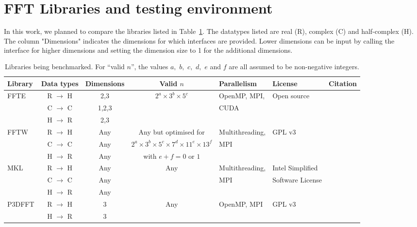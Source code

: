 \documentclass[a4]{article}
\begin{document}
\section{FFT Libraries and testing environment}\label{Sec:libs}

In this work, we planned to compare the libraries listed in Table~\ref{Tbl:libs}. 
The datatypes listed are real (R), complex (C) and half-complex (H). The column 
"Dimensions" indicates the dimensions for which interfaces are provided. Lower 
dimensions can be input by calling the interface for higher dimensions and 
setting the dimension size to 1 for the additional dimensions.

\begin{table}[h]
\begin{center}
\begin{small}
\begin{tabular}{|l|c|c|c|l|l|c|}
\hline
\textbf{Library} & \textbf{Data types} & \textbf{Dimensions} & \textbf{Valid $n$} & \textbf{Parallelism} & \textbf{License} & \textbf{Citation} \\ \hline
FFTE & R $\rightarrow$ H & 2,3   & $2^a\times 3^b \times 5^c$ & OpenMP, MPI,  & Open source & \cite{FFTE} \\
     & C $\rightarrow$ C & 1,2,3 & & CUDA & & \\
     & H $\rightarrow$ R & 2,3   & & & & \\ \hline
FFTW & R $\rightarrow$ H & Any   & Any but optimised for  & Multithreading, & GPL v3 & \cite{FFTW} \\
     & C $\rightarrow$ C & Any      & $2^a\times 3^b\times 5^c\times 7^d\times 11^e\times 13^f$ &  MPI & & \\
     & H $\rightarrow$ R & Any      & with $e+f = 0$ or $1$ & & & \\ \hline
MKL  & R $\rightarrow$ H & Any   & Any & Multithreading, & Intel Simplified & \cite{MKL} \\
     & C $\rightarrow$ C & Any      & & MPI & Software License & \\
     & H $\rightarrow$ R & Any   & & & & \\ \hline
P3DFFT & R $\rightarrow$ H & 3   & Any & OpenMP, MPI & GPL v3 & \cite{P3DFFT} \\
     & H $\rightarrow$ R & 3   & & & & \\ \hline

\end{tabular}
\caption{Libraries being benchmarked.  For ``valid $n$'', the values $a,$ $b,$ $c,$ $d,$ $e$ and $f$ are all assumed to be non-negative integers.}\label{Tbl:libs}
\end{small}
\end{center}
\end{table}
\end{document}
